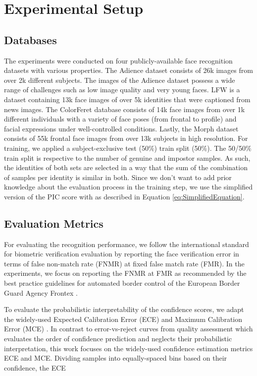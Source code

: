 \documentclass[10pt,twocolumn,letterpaper]{article}
\begin{document}
\section{Experimental Setup} 
\label{sec:ExperimentalSetup}

\subsection{Databases}
The experiments were conducted on four publicly-available face recognition datasets with various properties.
The Adience dataset \cite{Eidinger:2014:AGE:2771306.2772049} consists of 26k images from over 2k different subjects.
The images of the Adience dataset possess a wide range of challenges such as low image quality and very young faces.
LFW is a dataset \cite{LFWTech} containing 13k face images of over 5k identities that were captioned from news images.
The ColorFeret database \cite{DBLP:journals/pami/PhillipsMRR00} consists of 14k face images from over 1k different individuals with a variety of face poses (from frontal to profile) and facial expressions under well-controlled conditions.
Lastly, the Morph \cite{DBLP:conf/fgr/RicanekT06} dataset consists of 55k frontal face images from over 13k subjects in high resolution.
For training, we applied a subject-exclusive test (50\%) train split (50\%). The 50/50\% train split is respective to the number of genuine and impostor samples. As such, the identities of both sets are selected in a way that the sum of the combination of samples per identity is similar in both.
Since we don't want to add prior knowledge about the evaluation process in the training step, we use the simplified version of the PIC score with  as described in Equation \ref{eq:SimplifiedEquation}.



\subsection{Evaluation Metrics}
For evaluating the recognition performance, we follow the international standard for biometric verification evaluation \cite{ISO_Metrik} by reporting the face verification error in terms of false non-match rate (FNMR) at fixed false match rate (FMR).
In the experiments, we focus on reporting the FNMR at  FMR as recommended by the best practice guidelines for automated border control of the European Border Guard Agency Frontex \cite{FrontexBestPractice}.

To evaluate the probabilistic interpretability of the confidence scores, we adapt the widely-used Expected Calibration Error (ECE) and Maximum Calibration Error (MCE) \cite{DBLP:conf/aaai/NaeiniCH15, DBLP:conf/icml/GuoPSW17}.
{In contrast to error-vs-reject curves from quality assessment} \cite{DBLP:conf/cvpr/TerhorstKDKK20} which evaluates the order of confidence prediction and neglects their probabilistic interpretation, this work focuses on the widely-used confidence estimation metrics ECE and MCE.
Dividing  samples into  equally-spaced bins  based on their confidence, the ECE
\end{document}
